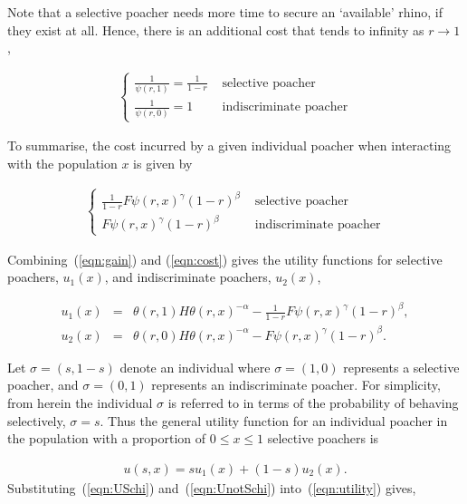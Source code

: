 \documentclass[10pt]{article}
\begin{document}
Note that a selective poacher needs
more time to secure an `available' rhino, if they exist at all. Hence, there is an
additional cost that tends to infinity as \(r \rightarrow 1\),

\begin{eqnarray}
    \label{eqn:selective_cost}
    \left\{
    \begin{array}{cl}
    \frac{1}{\psi(r, 1)} = \frac{1}{1 - r} & \mbox{ selective poacher}
    \\
    \frac{1}{\psi(r, 0)} = 1 & \mbox{ indiscriminate poacher}
    \end{array} \right.
\end{eqnarray}

To summarise, the cost incurred by a given individual poacher when interacting with
the population \(x\) is given by 

\begin{eqnarray}
    \label{eqn:cost}
    \left\{
    \begin{array}{cl}
    \frac{1}{1 - r}  F\psi(r, x)^{\gamma} (1-r)^{\beta}& \mbox{ selective poacher}
    \\
    F\psi(r, x)^{\gamma} (1-r)^{\beta}& \mbox{ indiscriminate poacher}
    \end{array} \right.
\end{eqnarray}

Combining~(\ref{eqn:gain}) and (\ref{eqn:cost}) gives the utility functions for 
selective poachers, \(u_1(x)\), and indiscriminate poachers, \(u_2(x)\), 

\begin{eqnarray} 
\label{eqn:USchi}
u_1(x) &=& \theta(r,1) H \theta(r,x)^{-\alpha}
- \frac{1}{1- r} F\psi(r, x)^{\gamma} (1-r)^{\beta} ,
\\
\label{eqn:UnotSchi}
u_2(x) &=& \theta(r,0) H \theta(r,x)^{-\alpha}
- F\psi(r, x)^{\gamma}  (1-r)^{\beta}.
\end{eqnarray}


Let \(\sigma=(s, 1 - s)\) denote an individual where \(\sigma =(1, 0)\) represents
a selective poacher, and \(\sigma=(0, 1)\) represents an indiscriminate poacher.
For simplicity, from herein the individual \(\sigma\) is referred to in terms
of the probability of behaving selectively, \(\sigma=s\).
Thus the general utility function for an individual poacher in the population with
a proportion of \(0 \leq x \leq 1\) selective poachers is

\begin{eqnarray}
\label{eqn:utility}
u(s, x) = s u_1(x) +(1 - s) u_2(x).
\end{eqnarray}
Substituting~(\ref{eqn:USchi}) and~(\ref{eqn:UnotSchi}) into~(\ref{eqn:utility}) gives,
\end{document}

